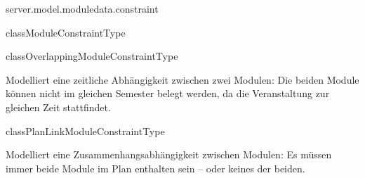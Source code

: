 \begin{texdocpackage}{server.model.moduledata.constraint}
\begin{texdocclass}{class}{ModuleConstraintType}
\begin{texdocclassmethods}
{
}
\end{texdocclassmethods}
\end{texdocclass}


\begin{texdocclass}{class}{OverlappingModuleConstraintType}
\label{texdoclet:edu.kit.informatik.studyplan.server.model.moduledata.constraint.OverlappingModuleConstraintType}
\begin{texdocclassintro}
Modelliert eine zeitliche Abhängigkeit zwischen zwei Modulen:\texdocbr{}
 Die beiden Module können nicht im gleichen Semester belegt werden, da die Veranstaltung zur gleichen Zeit stattfindet.\end{texdocclassintro}
\begin{texdocclassconstructors}
\end{texdocclassconstructors}
\begin{texdocclassmethods}
\end{texdocclassmethods}
\end{texdocclass}


\begin{texdocclass}{class}{PlanLinkModuleConstraintType}
\label{texdoclet:edu.kit.informatik.studyplan.server.model.moduledata.constraint.PlanLinkModuleConstraintType}
\begin{texdocclassintro}
Modelliert eine Zusammenhangsabhängigkeit zwischen Modulen: \texdocbr{}
 Es müssen immer beide Module im Plan enthalten sein – oder keines der beiden.\end{texdocclassintro}
\begin{texdocclassconstructors}
\end{texdocclassconstructors}
\begin{texdocclassmethods}
\end{texdocclassmethods}
\end{texdocclass}



\end{texdocpackage}

